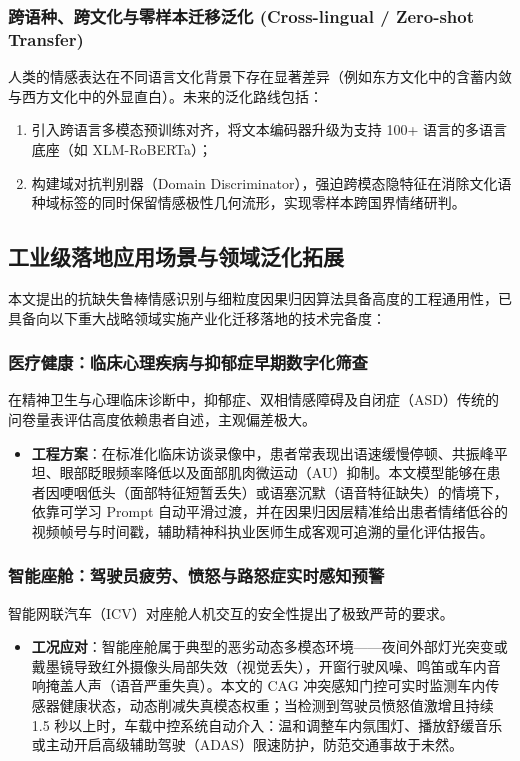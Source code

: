\subsubsection{跨语种、跨文化与零样本迁移泛化 (Cross-lingual / Zero-shot Transfer)}
人类的情感表达在不同语言文化背景下存在显著差异（例如东方文化中的含蓄内敛与西方文化中的外显直白）。未来的泛化路线包括：
\begin{enumerate}
    \item 引入跨语言多模态预训练对齐，将文本编码器升级为支持 100+ 语言的多语言底座（如 XLM-RoBERTa）；
    \item 构建域对抗判别器（Domain Discriminator），强迫跨模态隐特征在消除文化语种域标签的同时保留情感极性几何流形，实现零样本跨国界情绪研判。
\end{enumerate}

\clearpage

\subsection{工业级落地应用场景与领域泛化拓展}
本文提出的抗缺失鲁棒情感识别与细粒度因果归因算法具备高度的工程通用性，已具备向以下重大战略领域实施产业化迁移落地的技术完备度：

\subsubsection{医疗健康：临床心理疾病与抑郁症早期数字化筛查}
在精神卫生与心理临床诊断中，抑郁症、双相情感障碍及自闭症（ASD）传统的问卷量表评估高度依赖患者自述，主观偏差极大。
\begin{itemize}
    \item \textbf{工程方案}：在标准化临床访谈录像中，患者常表现出语速缓慢停顿、共振峰平坦、眼部眨眼频率降低以及面部肌肉微运动（AU）抑制。本文模型能够在患者因哽咽低头（面部特征短暂丢失）或语塞沉默（语音特征缺失）的情境下，依靠可学习 Prompt 自动平滑过渡，并在因果归因层精准给出患者情绪低谷的视频帧号与时间戳，辅助精神科执业医师生成客观可追溯的量化评估报告。
\end{itemize}

\subsubsection{智能座舱：驾驶员疲劳、愤怒与路怒症实时感知预警}
智能网联汽车（ICV）对座舱人机交互的安全性提出了极致严苛的要求。
\begin{itemize}
    \item \textbf{工况应对}：智能座舱属于典型的恶劣动态多模态环境——夜间外部灯光突变或戴墨镜导致红外摄像头局部失效（视觉丢失），开窗行驶风噪、鸣笛或车内音响掩盖人声（语音严重失真）。本文的 CAG 冲突感知门控可实时监测车内传感器健康状态，动态削减失真模态权重；当检测到驾驶员愤怒值激增且持续 1.5 秒以上时，车载中控系统自动介入：温和调整车内氛围灯、播放舒缓音乐或主动开启高级辅助驾驶（ADAS）限速防护，防范交通事故于未然。
\end{itemize}

